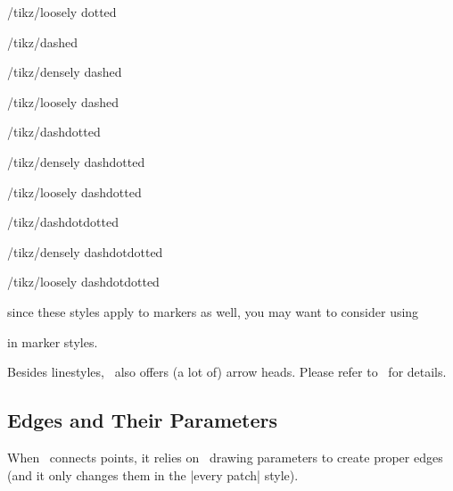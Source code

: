 \begin{stylekey}{/tikz/loosely dotted}
\end{stylekey}

\begin{stylekey}{/tikz/dashed}
\end{stylekey}

\begin{stylekey}{/tikz/densely dashed}
\end{stylekey}

\begin{stylekey}{/tikz/loosely dashed}
\end{stylekey}


\begin{stylekey}{/tikz/dashdotted}
\end{stylekey}

\begin{stylekey}{/tikz/densely dashdotted}
\end{stylekey}

\begin{stylekey}{/tikz/loosely dashdotted}
\end{stylekey}


\begin{stylekey}{/tikz/dashdotdotted}
\end{stylekey}

\begin{stylekey}{/tikz/densely dashdotdotted}
\end{stylekey}

\begin{stylekey}{/tikz/loosely dashdotdotted}
\end{stylekey}
\noindent since these styles apply to markers as well, you may want to consider using 
\begin{codeexample}
\end{codeexample}
\noindent in marker styles.

Besides linestyles, \PGF\ also offers (a lot of) arrow heads. Please refer to~\cite{tikz} for details.
\endgroup

\subsection{Edges and Their Parameters}
When \PGFPlots\ connects points, it relies on \PGF\ drawing parameters to create proper edges (and it only changes them in the |every patch| style).

